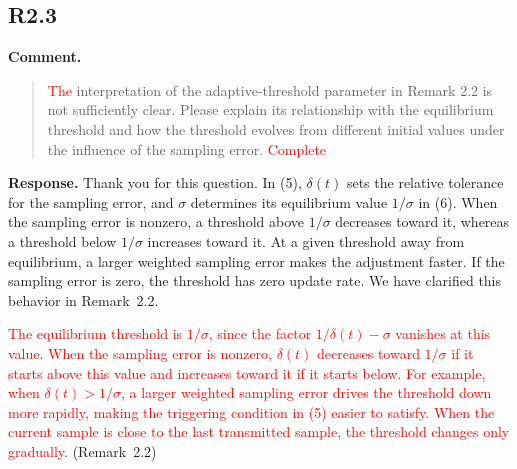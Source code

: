\documentclass[12pt,a4paper]{article}
\begin{document}
%
%

\subsection*{R2.3}

\textbf{Comment.}
\begin{quote}
\raggedright
\textcolor{red}{The} interpretation of the adaptive-threshold parameter in Remark 2.2 is not sufficiently clear. Please explain its relationship with the equilibrium threshold and how the threshold evolves from different initial values under the influence of the sampling error. \textcolor{red}{Complete}
\end{quote}

\textbf{Response.}
\begingroup
\setlength{\parskip}{6pt}
Thank you for this question. In (5), $\delta(t)$ sets the relative tolerance for the sampling error, and $\sigma$ determines its equilibrium value $1/\sigma$ in (6). When the sampling error is nonzero, a threshold above $1/\sigma$ decreases toward it, whereas a threshold below $1/\sigma$ increases toward it. At a given threshold away from equilibrium, a larger weighted sampling error makes the adjustment faster. If the sampling error is zero, the threshold has zero update rate. We have clarified this behavior in Remark~2.2.\par
\noindent \textcolor{red}{The equilibrium threshold is $1/\sigma$, since the factor $1/\delta(t)-\sigma$ vanishes at this value. When the sampling error is nonzero, $\delta(t)$ decreases toward $1/\sigma$ if it starts above this value and increases toward it if it starts below. For example, when $\delta(t)>1/\sigma$, a larger weighted sampling error drives the threshold down more rapidly, making the triggering condition in (5) easier to satisfy. When the current sample is close to the last transmitted sample, the threshold changes only gradually.} \mbox{(Remark~2.2)}\par
\endgroup
\end{document}
